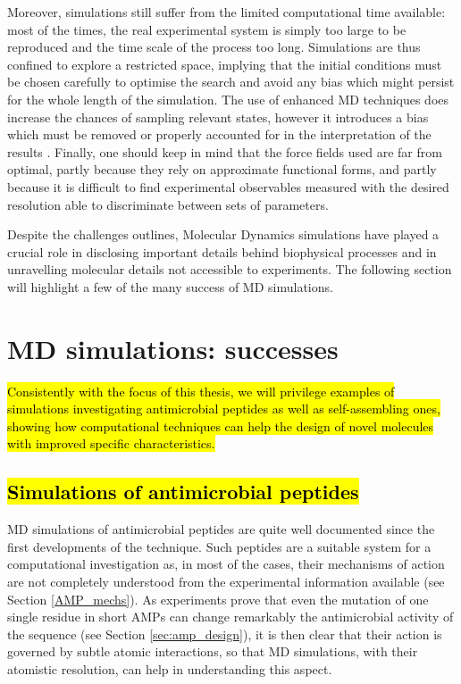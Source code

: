 Moreover, simulations still suffer from the limited computational time available: most of the times, the real experimental system is simply too large to be reproduced and the time scale of the process too long. Simulations are thus confined to explore a restricted space, implying that the initial conditions must be chosen carefully to optimise the search and avoid any bias which might persist for the whole length of the simulation. The use of enhanced MD techniques does increase the chances of sampling relevant states, however it introduces a bias which must be removed or properly accounted for in the interpretation of the results \cite{Bernardi2015,Best2005,Barducci2010,Barducci2011,Mills2008}.
Finally, one should keep in mind that the force fields used are far from optimal, partly because they rely on approximate functional forms, and partly because it is difficult to find experimental observables measured with the desired resolution able to discriminate between sets of parameters.

Despite the challenges outlines, Molecular Dynamics simulations have played a crucial role in disclosing important details behind biophysical processes and in unravelling molecular details not accessible to experiments. The following section will highlight a few of the many success of MD simulations.


\section{MD simulations: successes} \label{sec:md_lit}
\hl{Consistently with the focus of this thesis, we will privilege examples of simulations investigating antimicrobial peptides as well as self-assembling ones, showing how computational techniques can help the design of novel molecules with improved specific characteristics.}

\subsection{\hl{Simulations of antimicrobial peptides}}
MD simulations of antimicrobial peptides are quite well documented since the first developments of the technique. Such peptides are a suitable system for a computational investigation as, in most of the cases, their mechanisms of action are not completely understood from the experimental information available (see Section \ref{AMP_mechs}). As experiments prove that even the mutation of one single residue in short AMPs can change remarkably the antimicrobial activity of the sequence (see Section \ref{sec:amp_design}), it is then clear that their action is governed by subtle atomic interactions, so that MD simulations, with their atomistic resolution, can help in understanding this aspect.

